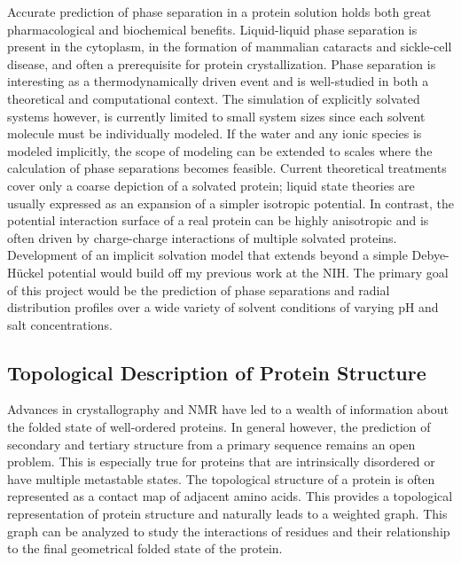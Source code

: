 \documentclass[]{scrartcl}
\newcommand{\insetpicture}[1]{\marginpar{\texttt{[image: \#1]}}}
\begin{document}
\begin{cleanCV}
Accurate prediction of phase separation in a protein solution holds both great pharmacological and biochemical benefits.
Liquid-liquid phase separation is present in the cytoplasm, in the formation of mammalian cataracts and sickle-cell disease, and often a prerequisite for protein crystallization.
Phase separation is interesting as a thermodynamically driven event and is well-studied in both a theoretical and computational context.
The simulation of explicitly solvated systems however, is currently limited to small system sizes since each solvent molecule must be individually modeled.
\insetpicture{images/research/macrocharge_lysozyme}
If the water and any ionic species is modeled implicitly, the scope of modeling can be extended to scales where the calculation of phase separations becomes feasible.
Current theoretical treatments cover only a coarse depiction of a solvated protein; liquid state theories are usually expressed as an expansion of a simpler isotropic potential.
In contrast, the potential interaction surface of a real protein can be highly anisotropic and is often driven by charge-charge interactions of multiple solvated proteins.
Development of an implicit solvation model that extends beyond a simple Debye-H\"{u}ckel potential would build off my previous work at the NIH.
The primary goal of this project would be the prediction of phase separations and radial distribution profiles over a wide variety of solvent conditions of varying pH and salt concentrations. 

\pagebreak

\subsection{Topological Description of Protein Structure}

Advances in crystallography and NMR have led to a wealth of information about the folded state of well-ordered proteins.
In general however, the prediction of secondary and tertiary structure from a primary sequence remains an open problem.
\insetpicture{images/research/3d_example_graph.png}
This is especially true for proteins that are intrinsically disordered or have multiple metastable states.
The topological structure of a protein is often represented as a contact map of adjacent amino acids.
This provides a topological representation of protein structure and naturally leads to a weighted graph.
This graph can be analyzed to study the interactions of residues and their relationship to the final geometrical folded state of the protein.


\end{cleanCV}
\end{document}
